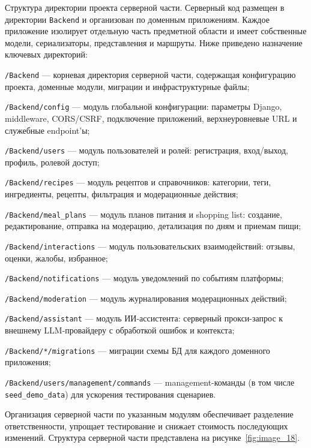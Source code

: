 Структура директории проекта серверной части. Серверный код размещен в директории \texttt{Backend} и организован по доменным приложениям. Каждое приложение изолирует отдельную часть предметной области и имеет собственные модели, сериализаторы, представления и маршруты. Ниже приведено назначение ключевых директорий:
\begin{compactlist}
  \item \texttt{/Backend} --- корневая директория серверной части, содержащая конфигурацию проекта, доменные модули, миграции и инфраструктурные файлы;
  \item \texttt{/Backend/config} --- модуль глобальной конфигурации: параметры Django, middleware, CORS/CSRF, подключение приложений, верхнеуровневые URL и служебные endpoint'ы;
  \item \texttt{/Backend/users} --- модуль пользователей и ролей: регистрация, вход/выход, профиль, ролевой доступ;
  \item \texttt{/Backend/recipes} --- модуль рецептов и справочников: категории, теги, ингредиенты, рецепты, фильтрация и модерационные действия;
  \item \texttt{/Backend/meal\_plans} --- модуль планов питания и shopping list: создание, редактирование, отправка на модерацию, детализация по дням и приемам пищи;
  \item \texttt{/Backend/interactions} --- модуль пользовательских взаимодействий: отзывы, оценки, жалобы, избранное;
  \item \texttt{/Backend/notifications} --- модуль уведомлений по событиям платформы;
  \item \texttt{/Backend/moderation} --- модуль журналирования модерационных действий;
  \item \texttt{/Backend/assistant} --- модуль ИИ-ассистента: серверный прокси-запрос к внешнему LLM-провайдеру с обработкой ошибок и контекста;
  \item \texttt{/Backend/*/migrations} --- миграции схемы БД для каждого доменного приложения;
  \item \texttt{/Backend/users/management/commands} --- management-команды (в том числе \texttt{seed\_demo\_data}) для ускорения тестирования сценариев.
\end{compactlist}

Организация серверной части по указанным модулям обеспечивает разделение ответственности, упрощает тестирование и снижает стоимость последующих изменений. Структура серверной части представлена на рисунке~\ref{fig:image_18}.

